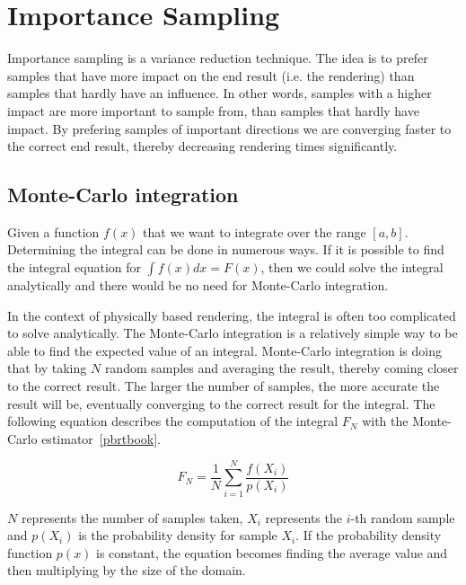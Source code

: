 \documentclass[11pt,a4paper]{report}
\begin{document}
%
%

\section{Importance Sampling}
\label{basics_importance_sampling}


Importance sampling is a variance reduction technique. The idea is to prefer samples that have more impact on the end result (i.e. the rendering) than samples that hardly have an influence. In other words, samples with a higher impact are more important to sample from, than samples that hardly have impact. By prefering samples of important directions we are converging faster to the correct end result, thereby decreasing rendering times significantly.

\subsection{Monte-Carlo integration}

Given a function $f(x)$ that we want to integrate over the range $[a, b]$. Determining the integral can be done in numerous ways. If it is possible to find the integral equation for $\int f(x) dx = F(x)$, then we could solve the integral analytically and there would be no need for Monte-Carlo integration.

In the context of physically based rendering, the integral is often too complicated to solve analytically. The Monte-Carlo integration is a relatively simple way to be able to find the expected value of an integral. Monte-Carlo integration is doing that by taking $N$ random samples and averaging the result, thereby coming closer to the correct result. The larger the number of samples, the more accurate the result will be, eventually converging to the correct result for the integral.  The following equation describes the computation of the integral $F_N$ with the Monte-Carlo estimator~\ref{pbrtbook}.

\begin{equation}
F_N = \frac{1}{N} \sum_{i=1}^{N} \frac{f(X_i)}{p(X_i)}
\end{equation}

$N$ represents the number of samples taken, $X_i$ represents the $i$-th random sample and $p(X_i)$ is the probability density for sample $X_i$. If the probability density function $p(x)$ is constant, the equation becomes finding the average value and then multiplying by the size of the domain.
\end{document}
